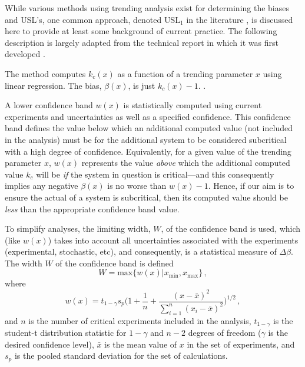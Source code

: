 While various methods using trending analysis exist for determining the 
biases and USL's, one common approach, denoted USL$_1$ in the 
literature \cite{broadhead2004sau}, is discussed here to provide at least 
some background of current practice. The following description is largely 
adapted from the technical report in which it was first developed 
\cite{lichtenwalter1997cbg}. 

The method computes $k_c(x)$ as a function of a trending parameter $x$ 
using linear regression.  The bias, $\beta(x)$, is just $k_c(x) - 1$.  .  

A lower confidence band $w(x)$ is statistically computed using current 
experiments and uncertainties as well as a specified confidence.  This 
confidence band defines the value below which an additional computed 
\keff value (\ie not included in the analysis) must be for the additional 
system to be considered subcritical with a high degree of confidence.  
Equivalently, for a given value of the trending parameter $x$, $w(x)$ 
represents the value \textit{ above} which the additional computed value $k_c$ 
will be \textit{ if} the system in question is critical---and this consequently 
implies any negative $\beta(x)$ is no worse than $w(x) - 1$.  Hence, if our 
aim is to ensure the actual \keff of a system is subcritical, then its 
computed value should be \textit{ less} than the appropriate confidence band 
value.

To simplify analyses, the limiting width, $W$, of the confidence band is 
used, which (like $w(x)$) takes into account all uncertainties associated 
with the experiments (\eg experimental, stochastic, etc), and consequently, 
is a statistical measure of $\Delta \beta$.  The width $W$ of the 
confidence band is defined
\begin{equation}
 W = \mathrm{max} \Big \{ w(x) | x_{\mathrm{min}},x_{\mathrm{max}} \Big \} \, ,
\label{eq:confwidth}
\end{equation}
where
\begin{equation}
 w(x) = t_{1-\gamma} s_p \Bigg ( 1 + \frac{1}{n} + 
        \frac{(x-\bar{x})^2}{\sum^n_{i=1} (x_i - \bar{x})^2} \Bigg )^{1/2} \, ,
\end{equation}
and $n$ is the number of critical experiments included in the analysis, 
$t_{1-\gamma}$ is the student-t distribution statistic for $1-\gamma$ 
and $n-2$ degrees of freedom ($\gamma$ is the desired confidence level), 
$\bar{x}$ is the mean value of $x$ in the set of experiments, and $s_p$ 
is the pooled standard deviation for the set of calculations.

